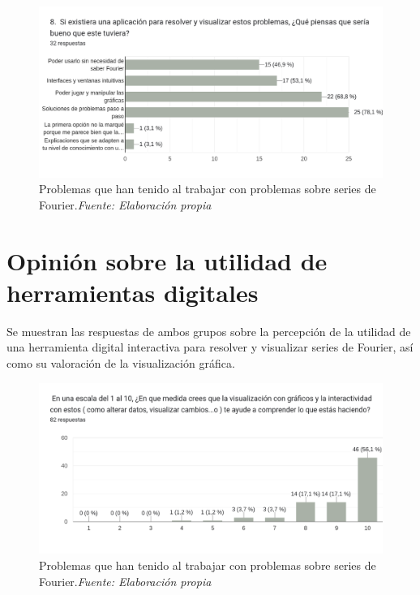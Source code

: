 \begin{figure}[H]
	\centering
	\includegraphics[width=1\textwidth]{img/appendixA/8_cosas_deberie_tener.png}
	\caption[Problemas que han tenido al trabajar con problemas sobre series de Fourier.]{Problemas que han tenido al trabajar con problemas sobre series de Fourier.\textit{Fuente: Elaboración propia}}
	\label{fig:app1_cosas_deberie_tener}  %
\end{figure}


\newpage
\section{Opinión sobre la utilidad de herramientas digitales}
Se muestran las respuestas de ambos grupos sobre la percepción de la utilidad de una herramienta digital interactiva para resolver y visualizar series de Fourier, así como su valoración de la visualización gráfica.

\begin{figure}[H]
	\centering
	\includegraphics[width=1\textwidth]{img/appendixA/11_importancia_interactividad.png}
	\caption[Problemas que han tenido al trabajar con problemas sobre series de Fourier.]{Problemas que han tenido al trabajar con problemas sobre series de Fourier.\textit{Fuente: Elaboración propia}}
	\label{fig:app1_importancia_interactividad}  %
\end{figure}

